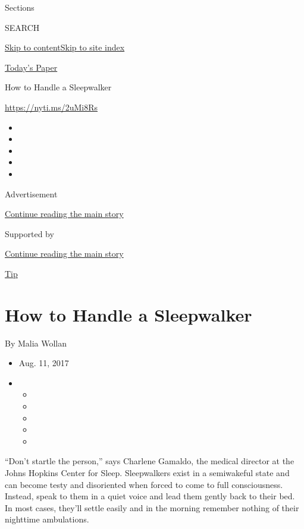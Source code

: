 Sections

SEARCH

\protect\hyperlink{site-content}{Skip to
content}\protect\hyperlink{site-index}{Skip to site index}

\href{https://myaccount.nytimes3xbfgragh.onion/auth/login?response_type=cookie\&client_id=vi}{}

\href{https://www.nytimes3xbfgragh.onion/section/todayspaper}{Today's
Paper}

How to Handle a Sleepwalker

\url{https://nyti.ms/2uMi8Rs}

\begin{itemize}
\item
\item
\item
\item
\item
\end{itemize}

Advertisement

\protect\hyperlink{after-top}{Continue reading the main story}

Supported by

\protect\hyperlink{after-sponsor}{Continue reading the main story}

\href{/column/magazine-tip}{Tip}

\hypertarget{how-to-handle-a-sleepwalker}{%
\section{How to Handle a
Sleepwalker}\label{how-to-handle-a-sleepwalker}}

By Malia Wollan

\begin{itemize}
\item
  Aug. 11, 2017
\item
  \begin{itemize}
  \item
  \item
  \item
  \item
  \item
  \end{itemize}
\end{itemize}

``Don't startle the person,'' says Charlene Gamaldo, the medical
director at the Johns Hopkins Center for Sleep. Sleepwalkers exist in a
semiwakeful state and can become testy and disoriented when forced to
come to full consciousness. Instead, speak to them in a quiet voice and
lead them gently back to their bed. In most cases, they'll settle easily
and in the morning remember nothing of their nighttime ambulations.

